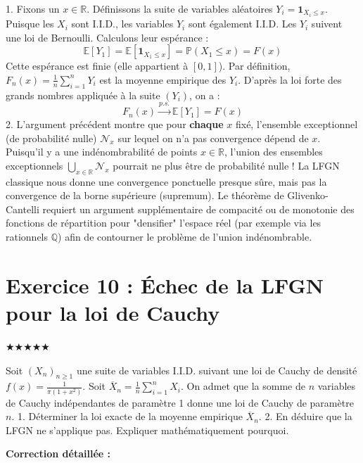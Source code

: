 \documentclass[11pt,a4paper]{article}
\begin{document}
1. Fixons un $x \in \mathbb{R}$.
   Définissons la suite de variables aléatoires $Y_i = \mathbf{1}_{X_i \leq x}$.
   Puisque les $X_i$ sont I.I.D., les variables $Y_i$ sont également I.I.D.
   Les $Y_i$ suivent une loi de Bernoulli. Calculons leur espérance :
   $$ \mathbb{E}[Y_1] = \mathbb{E}[\mathbf{1}_{X_1 \leq x}] = \mathbb{P}(X_1 \leq x) = F(x) $$
   Cette espérance est finie (elle appartient à $[0,1]$).
   Par définition, $F_n(x) = \frac{1}{n} \sum_{i=1}^n Y_i$ est la moyenne empirique des $Y_i$.
   D'après la loi forte des grands nombres appliquée à la suite $(Y_i)$, on a :
   $$ F_n(x) \xrightarrow{p.s.} \mathbb{E}[Y_1] = F(x) $$
2. L'argument précédent montre que pour \textbf{chaque} $x$ fixé, l'ensemble exceptionnel (de probabilité nulle) $\mathcal{N}_x$ sur lequel on n'a pas convergence dépend de $x$.
   Puisqu'il y a une indénombrabilité de points $x \in \mathbb{R}$, l'union des ensembles exceptionnels $\bigcup_{x \in \mathbb{R}} \mathcal{N}_x$ pourrait ne plus être de probabilité nulle !
   La LFGN classique nous donne une convergence ponctuelle presque sûre, mais pas la convergence de la borne supérieure (supremum).
   Le théorème de Glivenko-Cantelli requiert un argument supplémentaire de compacité ou de monotonie des fonctions de répartition pour "densifier" l'espace réel (par exemple via les rationnels $\mathbb{Q}$) afin de contourner le problème de l'union indénombrable.


\section*{Exercice 10 : Échec de la LFGN pour la loi de Cauchy}

$\bigstar\bigstar\bigstar\bigstar\bigstar$

Soit $(X_n)_{n \geq 1}$ une suite de variables I.I.D. suivant une loi de Cauchy de densité $f(x) = \frac{1}{\pi(1+x^2)}$.
Soit $\overline{X}_n = \frac{1}{n} \sum_{i=1}^n X_i$.
On admet que la somme de $n$ variables de Cauchy indépendantes de paramètre 1 donne une loi de Cauchy de paramètre $n$.
1. Déterminer la loi exacte de la moyenne empirique $\overline{X}_n$.
2. En déduire que la LFGN ne s'applique pas. Expliquer mathématiquement pourquoi.

\textbf{Correction détaillée :}
\end{document}
